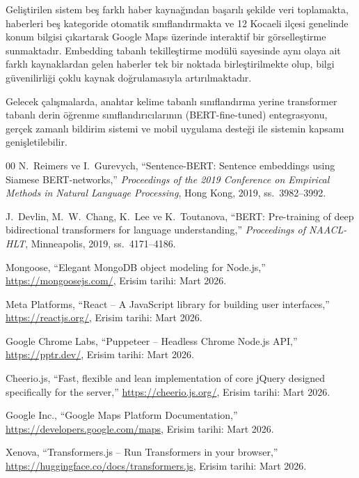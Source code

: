 \documentclass[conference]{IEEEtran}
\begin{document}
    Geli{\c s}tirilen sistem be{\c s} farkl{\i} haber kayna{\u g}{\i}ndan ba{\c s}ar{\i}l{\i} {\c s}ekilde veri toplamakta, haberleri be{\c s} kategoride otomatik s{\i}n{\i}fland{\i}rmakta ve 12 Kocaeli il{\c c}esi genelinde konum bilgisi {\c c}{\i}kartarak Google Maps {\"u}zerinde interaktif bir g{\"o}rselle{\c s}tirme sunmaktad{\i}r. Embedding tabanl{\i} tekille{\c s}tirme mod{\"u}l{\"u} sayesinde ayn{\i} olaya ait farkl{\i} kaynaklardan gelen haberler tek bir noktada birle{\c s}tirilmekte olup, bilgi g{\"u}venilirli{\u g}i {\c c}oklu kaynak do{\u g}rulamas{\i}yla art{\i}r{\i}lmaktad{\i}r.

    Gelecek {\c c}al{\i}{\c s}malarda, anahtar kelime tabanl{\i} s{\i}n{\i}fland{\i}rma yerine transformer tabanl{\i} derin {\"o}{\u g}renme s{\i}n{\i}fland{\i}r{\i}c{\i}lar{\i}n{\i}n (BERT-fine-tuned) entegrasyonu, ger{\c c}ek zamanl{\i} bildirim sistemi ve mobil uygulama deste{\u g}i ile sistemin kapsam{\i} geni{\c s}letilebilir.

    \begin{thebibliography}{00}
        N.~Reimers ve I.~Gurevych, ``Sentence-BERT: Sentence embeddings using Siamese BERT-networks,'' \textit{Proceedings of the 2019 Conference on Empirical Methods in Natural Language Processing}, Hong Kong, 2019, ss.~3982--3992.

        J.~Devlin, M.~W.~Chang, K.~Lee ve K.~Toutanova, ``BERT: Pre-training of deep bidirectional transformers for language understanding,'' \textit{Proceedings of NAACL-HLT}, Minneapolis, 2019, ss.~4171--4186.

        Mongoose, ``Elegant MongoDB object modeling for Node.js,'' \url{https://mongoosejs.com/}, Erisim tarihi: Mart 2026.

        Meta Platforms, ``React -- A JavaScript library for building user interfaces,'' \url{https://reactjs.org/}, Erisim tarihi: Mart 2026.

        Google Chrome Labs, ``Puppeteer -- Headless Chrome Node.js API,'' \url{https://pptr.dev/}, Erisim tarihi: Mart 2026.

        Cheerio.js, ``Fast, flexible and lean implementation of core jQuery designed specifically for the server,'' \url{https://cheerio.js.org/}, Erisim tarihi: Mart 2026.

        Google Inc., ``Google Maps Platform Documentation,'' \url{https://developers.google.com/maps}, Erisim tarihi: Mart 2026.

        Xenova, ``Transformers.js -- Run Transformers in your browser,'' \url{https://huggingface.co/docs/transformers.js}, Erisim tarihi: Mart 2026.
    \end{thebibliography}
\end{document}
